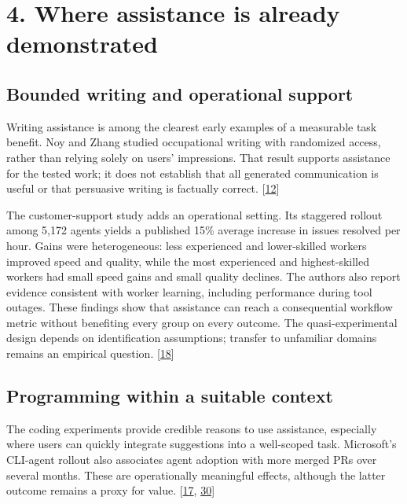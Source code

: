 \section*{4. Where assistance is already demonstrated}

\subsection*{Bounded writing and operational support}
Writing assistance is among the clearest early examples of a measurable task benefit. Noy and Zhang studied occupational writing with randomized access, rather than relying solely on users' impressions. That result supports assistance for the tested work; it does not establish that all generated communication is useful or that persuasive writing is factually correct. [\hyperlink{ref-noy2023}{12}]


The customer-support study adds an operational setting. Its staggered rollout among 5,172 agents yields a published 15\% average increase in issues resolved per hour. Gains were heterogeneous: less experienced and lower-skilled workers improved speed and quality, while the most experienced and highest-skilled workers had small speed gains and small quality declines. The authors also report evidence consistent with worker learning, including performance during tool outages. These findings show that assistance can reach a consequential workflow metric without benefiting every group on every outcome. The quasi-experimental design depends on identification assumptions; transfer to unfamiliar domains remains an empirical question. [\hyperlink{ref-brynjolfsson2025}{18}]



\subsection*{Programming within a suitable context}
The coding experiments provide credible reasons to use assistance, especially where users can quickly integrate suggestions into a well-scoped task. Microsoft's CLI-agent rollout also associates agent adoption with more merged PRs over several months. These are operationally meaningful effects, although the latter outcome remains a proxy for value. [\hyperlink{ref-cui2025}{17}, \hyperlink{ref-murphyhill2026}{30}]



